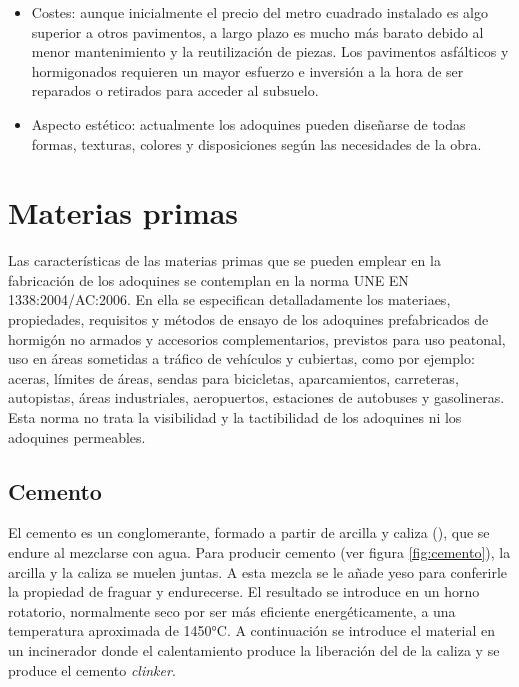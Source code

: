 \begin{itemize}
\item Costes: aunque inicialmente el precio del metro cuadrado instalado es algo superior a otros pavimentos, a largo plazo es mucho más barato debido al menor mantenimiento y la reutilización de piezas. Los pavimentos asfálticos y hormigonados requieren un mayor esfuerzo e inversión a la hora de ser reparados o retirados para acceder al subsuelo.

\item Aspecto estético: actualmente los adoquines pueden diseñarse de todas formas, texturas, colores y disposiciones según las necesidades de la obra.
\end{itemize}


\section{Materias primas}
Las características de las materias primas que se pueden emplear en la fabricación de los adoquines se contemplan en la norma UNE EN 1338:2004/AC:2006. En ella se especifican detalladamente los materiaes, propiedades, requisitos y métodos de ensayo de los adoquines prefabricados de hormigón no armados y accesorios complementarios, previstos para uso peatonal, uso en áreas sometidas a tráfico de vehículos y cubiertas, como por ejemplo: aceras, límites de áreas, sendas para bicicletas, aparcamientos, carreteras, autopistas, áreas industriales, aeropuertos, estaciones de autobuses y gasolineras. Esta norma no trata la visibilidad y la tactibilidad de los adoquines ni los adoquines permeables.

\subsection{Cemento}
El cemento es un conglomerante, formado a partir de arcilla y caliza (), que se endure al mezclarse con agua. Para producir cemento (ver figura \ref{fig:cemento}), la arcilla y la caliza se muelen juntas. A esta mezcla se le añade yeso para conferirle la propiedad de fraguar y endurecerse. El resultado se introduce en un horno rotatorio, normalmente seco por ser más eficiente energéticamente, a una temperatura aproximada de 1450\si{\celsius}. A continuación se introduce el material en un incinerador donde el calentamiento produce la liberación del  de la caliza y se produce el cemento \emph{clinker}.

